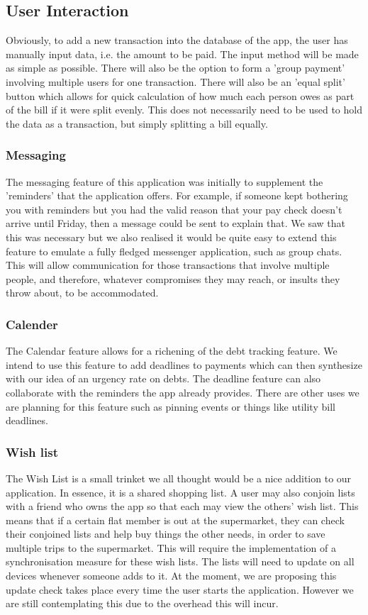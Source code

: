 \documentclass[a4paper,11pt]{article}
\begin{document}
\subsection*{User Interaction}
Obviously, to add a new transaction into the database of the app, the user has manually input data, i.e. the amount to be paid. The input method will be made as simple as possible. There will also be the option to form a 'group payment' involving multiple users for one transaction. There will also be an 'equal split' button which allows for quick calculation of how much each person owes as part of the bill if it were split evenly. This does not necessarily need to be used to hold the data as a transaction, but simply splitting a bill equally.

\subsubsection*{Messaging}
The messaging feature of this application was initially to supplement the 'reminders' that the application offers. For example, if someone kept bothering you with reminders but you had the valid reason that your pay check doesn't arrive until Friday, then a message could be sent to explain that.
We saw that this was necessary but we also realised it would be quite easy to extend this feature to emulate a fully fledged messenger application, such as group chats. This will allow communication for those transactions that involve multiple people, and therefore, whatever compromises they may reach, or insults they throw about, to be accommodated.

\subsubsection*{Calender}
The Calendar feature allows for a richening of the debt tracking feature. We intend to use this feature to add deadlines to payments which can then synthesize with our idea of an urgency rate on debts. The deadline feature can also collaborate with the reminders the app already provides.
There are other uses we are planning for this feature such as pinning events or things like utility bill deadlines.

\subsubsection*{Wish list}
The Wish List is a small trinket we all thought would be a nice addition to our application. In essence, it is a shared shopping list. A user may also conjoin lists with a friend who owns the app so that each may view the others' wish list. This means that if a certain flat member is out at the supermarket, they can check their conjoined lists and help buy things the other needs, in order to save multiple trips to the supermarket.
This will require the implementation of a synchronisation measure for these wish lists. The lists will need to update on all devices whenever someone adds to it. At the moment, we are proposing this update check takes place every time the user starts the application. However we are still contemplating this due to the overhead this will incur.
\end{document}
